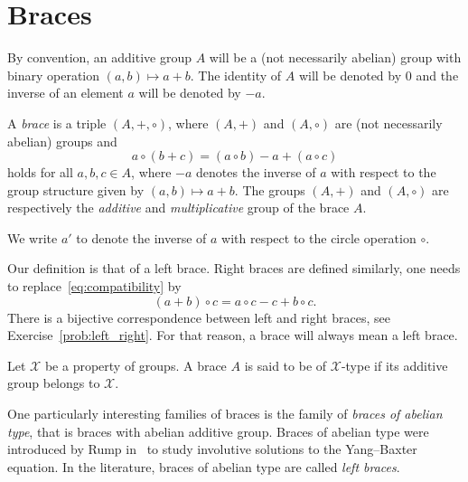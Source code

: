 \chapter{Braces}
\label{braces}


By convention, an additive group $A$ will be a (not necessarily abelian) group 
with binary operation $(a,b)\mapsto a+b$. The 
identity of $A$ will be denoted by $0$ and the inverse of an element $a$ will be denoted by $-a$. 

\begin{definition}
    \label{def:brace}
	A \emph{brace} is a triple $(A,+,\circ)$, where $(A,+)$ and $(A,\circ)$ 
	are (not necessarily abelian) 
	groups and 
	\begin{equation}
	    \label{eq:compatibility}
	    a\circ(b+c)=(a\circ b)-a+(a\circ c)
	\end{equation}
	holds for all $a,b,c\in A$, where $-a$ denotes the inverse of $a$ with
	respect to the group structure given by $(a,b)\mapsto a+b$. The groups 
	$(A,+)$ and $(A,\circ)$ are respectively 
	the \emph{additive} and \emph{multiplicative} group
	of the brace $A$.
\end{definition}

We write $a'$ to denote the inverse of $a$ with respect to the circle operation $\circ$. 

Our definition is that of a left brace. Right braces are defined similarly, one needs 
to replace~\eqref{eq:compatibility} by 
\[
(a+b)\circ c=a\circ c-c+b\circ c.
\]
There is a bijective correspondence between left and right braces, 
see Exercise~\ref{prob:left_right}. For that reason, 
a brace will always mean a left brace. 

\begin{definition}
    Let $\mathcal{X}$ be a property of groups. A brace $A$ is said to be
    of $\mathcal{X}$-type if its additive group belongs to $\mathcal{X}$.
\end{definition}

One particularly interesting families of braces is the family of \emph{braces of abelian type}, 
that is braces with abelian additive group. 
Braces of abelian type were introduced by Rump in~\cite{MR2278047} to study involutive solutions to the Yang--Baxter equation. 
In the literature, braces of abelian type are called \emph{left braces}. 

